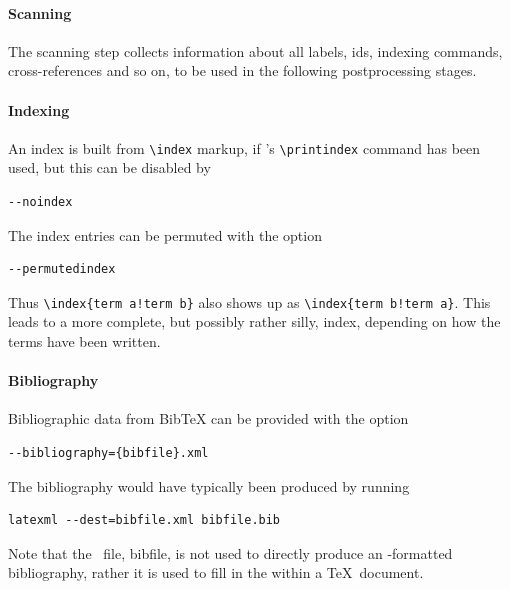 \documentclass{book}
\begin{document}
\paragraph{Scanning}
The scanning step collects information about all labels, ids,
indexing commands, cross-references and so on, to be used
in the following postprocessing stages.

\paragraph{Indexing}
An index is built from \verb|\index| markup, if
's \verb|\printindex| command has been used,
but this can be disabled by
\begin{lstlisting}[style=shell]
--noindex
\end{lstlisting}
The index entries can be permuted with the option
\begin{lstlisting}[style=shell]
--permutedindex
\end{lstlisting}
Thus \verb|\index{term a!term b}| also shows up as \verb|\index{term b!term a}|.
This leads to a more complete, but possibly rather silly, index,
depending on how the terms have been written.

\paragraph{Bibliography}
Bibliographic data from BibTeX can be provided with the option
\begin{lstlisting}[style=shell]
--bibliography={bibfile}.xml
\end{lstlisting}
The bibliography would have typically been produced by running
\begin{lstlisting}[style=shell]
latexml --dest=bibfile.xml bibfile.bib
\end{lstlisting}
Note that the \XML\ file, bibfile, is not used to directly produce
an \HTML-formatted bibliography, rather it is used to fill in
the \verb|| within a \TeX\ document.
\end{document}
